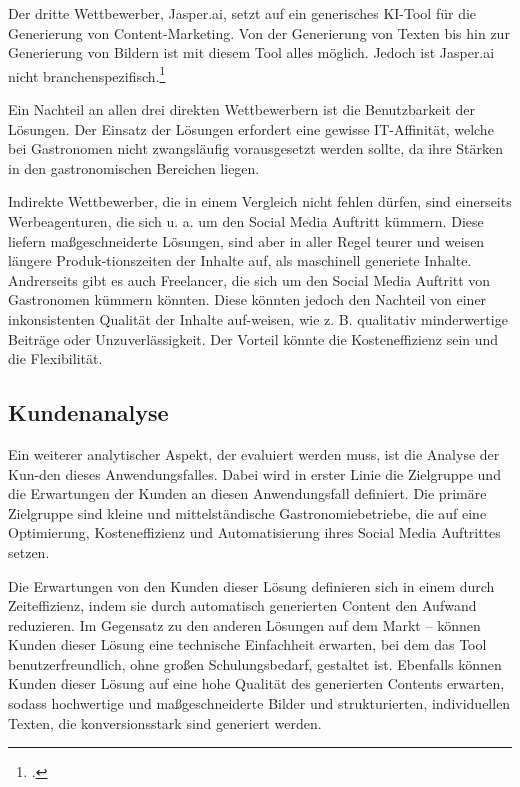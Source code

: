 Der dritte Wettbewerber, Jasper.ai, setzt auf ein generisches KI-Tool für die Generierung von Content-Marketing.
Von der Generierung von Texten bis hin zur Generierung von Bildern ist mit diesem Tool alles möglich.
Jedoch ist Jasper.ai nicht branchenspezifisch.\footcite{jasper_ai_product_marketers}

Ein Nachteil an allen drei direkten Wettbewerbern ist die Benutzbarkeit der Lösungen.
Der Einsatz der Lösungen erfordert eine gewisse IT-Affinität, welche bei Gastronomen nicht zwangsläufig vorausgesetzt werden sollte, da ihre Stärken in den gastronomischen Bereichen liegen.

Indirekte Wettbewerber, die in einem Vergleich nicht fehlen dürfen, sind einerseits Werbeagenturen, die sich u. a. um den Social Media Auftritt kümmern. Diese liefern maßgeschneiderte Lösungen, sind aber in aller Regel teurer und weisen längere Produk-tionszeiten der Inhalte auf, als maschinell generiete Inhalte.
Andrerseits gibt es auch Freelancer, die sich um den Social Media Auftritt von Gastronomen kümmern könnten.
Diese könnten jedoch den Nachteil von einer inkonsistenten Qualität der Inhalte auf-weisen, wie z. B. qualitativ minderwertige Beiträge oder Unzuverlässigkeit.
Der Vorteil könnte die Kosteneffizienz sein und die Flexibilität.

\subsection{Kundenanalyse}
Ein weiterer analytischer Aspekt, der evaluiert werden muss, ist die Analyse der Kun-den dieses Anwendungsfalles.
Dabei wird in erster Linie die Zielgruppe und die Erwartungen der Kunden an diesen Anwendungsfall definiert.
Die primäre Zielgruppe sind kleine und mittelständische Gastronomiebetriebe, die auf eine Optimierung, Kosteneffizienz und Automatisierung ihres Social Media Auftrittes setzen.

Die Erwartungen von den Kunden dieser Lösung definieren sich in einem durch Zeiteffizienz, indem sie durch automatisch generierten Content den Aufwand reduzieren.
Im Gegensatz zu den anderen Lösungen auf dem Markt – können Kunden dieser Lösung eine technische Einfachheit erwarten, bei dem das Tool benutzerfreundlich, ohne großen Schulungsbedarf, gestaltet ist.
Ebenfalls können Kunden dieser Lösung auf eine hohe Qualität des generierten Contents erwarten, sodass hochwertige und maßgeschneiderte Bilder und strukturierten, individuellen Texten, die konversionsstark sind generiert werden.


